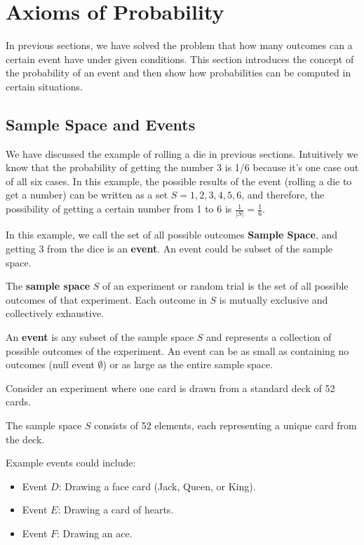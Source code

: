     
    \section{Axioms of Probability}
    In previous sections, we have solved the problem that how many outcomes can a certain event have under
    given conditions. This section introduces the concept of the probability of an event and then
    show how probabilities can be computed in certain situations. 

    \subsection{Sample Space and Events}
    We have discussed the example of rolling a die in previous sections. Intuitively we know that
    the probability of getting the number 3 is 1/6 because it's one case out of all six cases. In 
    this example, the possible results of the event (rolling a die to get a number) can be written
    as a set $S = {1,2,3,4,5,6}$, and therefore, the possibility of getting a certain number 
    from 1 to 6 is $\frac{1}{|S|} = \frac{1}{6}$.

    In this example, we call the set of all possible outcomes \textbf{Sample Space}, and getting
    3 from the dice is an \textbf{event}. An event could be subset of the sample space.

    \begin{definition}
        The \textbf{sample space} $S$ of an experiment or random trial is the set of all possible outcomes of that experiment. Each outcome in $S$ is mutually exclusive and collectively exhaustive.
    \end{definition}

    \begin{definition}[Event]
        An \textbf{event} is any subset of the sample space $S$ and represents a collection of possible outcomes of the experiment. An event can be as small as containing no outcomes (null event $\emptyset$) or as large as the entire sample space.
    \end{definition}

    \begin{example}
        Consider an experiment where one card is drawn from a standard deck of 52 cards.

        The sample space \( S \) consists of 52 elements, each representing a unique card from the deck.
        
        Example events could include:
        \begin{itemize}
        \item Event \( D \): Drawing a face card (Jack, Queen, or King).
        \item Event \( E \): Drawing a card of hearts.
        \item Event \( F \): Drawing an ace.
        \end{itemize}
    \end{example}

